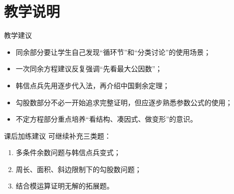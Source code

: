 \documentclass[11pt,a4paper,fontset=fandol]{ctexart}
\theoremstyle{formaltheorem}
\theoremstyle{formalexample}
\begin{document}
\section{教学说明}

\begin{notebox}{教学建议}
\begin{itemize}
  \item 同余部分要让学生自己发现“循环节”和“分类讨论”的使用场景；
  \item 一次同余方程建议反复强调“先看最大公因数”；
  \item 韩信点兵先用逐步代入法，再介绍中国剩余定理；
  \item 勾股数部分不必一开始追求完整证明，但应逐步熟悉参数公式的使用；
  \item 不定方程部分重点培养“看结构、凑因式、做变形”的意识。
\end{itemize}
\end{notebox}

\begin{notebox}{课后加练建议}
可继续补充三类题：
\begin{enumerate}
  \item 多条件余数问题与韩信点兵变式；
  \item 周长、面积、斜边限制下的勾股数问题；
  \item 结合模运算证明无解的拓展题。
\end{enumerate}
\end{notebox}
\end{document}
